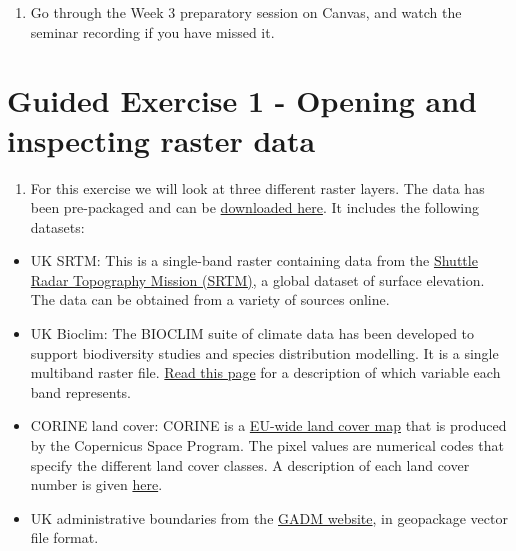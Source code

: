 \documentclass[
  letterpaper,
  DIV=11,
  numbers=noendperiod]{scrreprt}
\providecommand{\tightlist}{%
  \setlength{\itemsep}{0pt}\setlength{\parskip}{0pt}}\usepackage{longtable,booktabs,array}
\begin{document}
\begin{enumerate}
\def\labelenumi{\arabic{enumi}.}
\tightlist
\item
  Go through the Week 3 preparatory session on Canvas, and watch the
  seminar recording if you have missed it.
\end{enumerate}

\section{Guided Exercise 1 - Opening and inspecting raster
data}\label{guided-exercise-1---opening-and-inspecting-raster-data}

\begin{enumerate}
\def\labelenumi{(\arabic{enumi})}
\setcounter{enumi}{121}
\tightlist
\item
  For this exercise we will look at three different raster layers. The
  data has been pre-packaged and can be
  \href{https://stir-my.sharepoint.com/:u:/g/personal/ala2_stir_ac_uk/ESim8eCFo_ZCkZ4DQJ6eKpcBSJQSWHQErdPpkgcktwrXtg?e=5eG27g}{downloaded
  here}. It includes the following datasets:
\end{enumerate}

\begin{itemize}
\item
  UK SRTM: This is a single-band raster containing data from the
  \href{https://en.wikipedia.org/wiki/Shuttle_Radar_Topography_Mission}{Shuttle
  Radar Topography Mission (SRTM)}, a global dataset of surface
  elevation. The data can be obtained from a variety of sources online.
\item
  UK Bioclim: The BIOCLIM suite of climate data has been developed to
  support biodiversity studies and species distribution modelling. It is
  a single multiband raster file.
  \href{https://www.worldclim.org/data/bioclim.html}{Read this page} for
  a description of which variable each band represents.
\item
  CORINE land cover: CORINE is a
  \href{https://land.copernicus.eu/en/products/corine-land-cover}{EU-wide
  land cover map} that is produced by the Copernicus Space Program. The
  pixel values are numerical codes that specify the different land cover
  classes. A description of each land cover number is given
  \href{https://land.copernicus.eu/content/corine-land-cover-nomenclature-guidelines/html/}{here}.
\item
  UK administrative boundaries from the \href{https://gadm.org/}{GADM
  website}, in geopackage vector file format.
\end{itemize}
\end{document}
